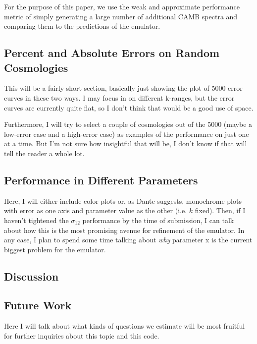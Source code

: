 \documentclass[11pt]{article}
\begin{document}
For the purpose of this paper, we use the weak and approximate performance metric of simply generating a large number of additional CAMB spectra and comparing them to the predictions of the emulator.

\begin{centering}
\subsection{Percent and Absolute Errors on Random Cosmologies}
\end{centering}

This will be a fairly short section, basically just showing the plot of 5000 error curves in these two ways. I may focus in on different k-ranges, but the error curves are currently quite flat, so I don't think that would be a good use of space.

Furthermore, I will try to select a couple of cosmologies out of the 5000 (maybe a low-error case and a high-error case) as examples of the performance on just one at a time. But I'm not sure how insightful that will be, I don't know if that will tell the reader a whole lot.

\begin{centering}
\subsection{Performance in Different Parameters}
\end{centering}

Here, I will either include color plots or, as Dante suggests, monochrome plots with error as one axis and parameter value as the other (i.e. $k$ fixed). Then, if I haven't tightened the $\sigma_{12}$ performance by the time of submission, I can talk about how this is the most promising avenue for refinement of the emulator. In any case, I plan to spend some time talking about \textit{why} parameter x is the current biggest problem for the emulator. 

\begin{centering}
\section{Discussion}
\end{centering}

\begin{centering}
\subsection{Future Work}
\end{centering}

Here I will talk about what kinds of questions we estimate will be most fruitful for further inquiries about this topic and this code.

 {
    \printbibliography
}
\end{document}
